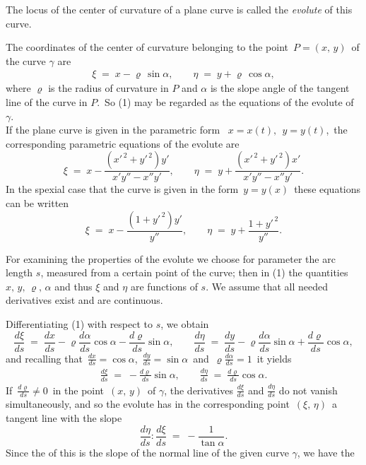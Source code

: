 \documentclass[12pt]{article}
\begin{document}
The locus of the center of curvature of a plane curve is called the {\em evolute} of this curve.

The coordinates of the center of curvature belonging to the point \,$P = (x,\,y)$\, of the curve $\gamma$ are
\begin{align}
\xi \;=\; x-\varrho\,\sin\alpha,\qquad \eta \;=\; y+\varrho\,\cos\alpha,
\end{align}
where $\varrho$ is the radius of curvature in $P$ and $\alpha$ is the slope angle of the tangent line of the curve in $P$.\, So (1) may be regarded as the equations of the evolute of $\gamma$.\\

If the plane curve is given in the parametric form \, $x = x(t),\;\, y = y(t)$,\, the corresponding parametric equations of the evolute are
 $$\xi \;=\; x-\frac{(x'^{\,2}\!+\!y'^{\,2})y'}{x'y''\!-\!x''y'},\qquad
 \eta \;=\; y+\frac{(x'^{\,2}\!+\!y'^{\,2})x'}{x'y''\!-\!x''y'}.$$
In the spexial case that the curve is given in the form\, $y = y(x)$\, these equations can be written
 $$\xi \;=\; x-\frac{(1\!+\!y'^{\,2})y'}{y''},\qquad \eta \;=\; y+\frac{1\!+\!y'^{\,2}}{y''}.$$


For examining the properties of the evolute we choose for parameter the arc length $s$, measured from a certain point of the curve; then in (1) the quantities $x,\,y,\,\varrho,\,\alpha$ and thus $\xi$ and $\eta$ are functions of $s$.  We assume that all needed derivatives exist and are continuous.

Differentiating (1) with respect to $s$, we obtain
 $$\frac{d\xi}{ds} \;=\; \frac{dx}{ds}-\varrho\frac{d\alpha}{ds}\cos\alpha-\frac{d\varrho}{ds}\sin\alpha,\qquad
  \frac{d\eta}{ds} \;=\; \frac{dy}{ds}-\varrho\frac{d\alpha}{ds}\sin\alpha+\frac{d\varrho}{ds}\cos\alpha,$$
and recalling that\, $\frac{dx}{ds} = \cos\alpha$,\, $\frac{dy}{ds} = \sin\alpha$\, and\, $\varrho\frac{d\alpha}{ds} = 1$\, it yields
\begin{align}
\frac{d\xi}{ds} \;=\; -\frac{d\varrho}{ds}\sin\alpha,\qquad \frac{d\eta}{ds} \;=\; \frac{d\varrho}{ds}\cos\alpha.
\end{align}
If\, $\frac{d\varrho}{ds} \neq 0$\, in the point \,$(x,\,y)$\, of $\gamma$, the derivatives $\frac{d\xi}{ds}$ and $\frac{d\eta}{ds}$ do not vanish simultaneously, and so the evolute has in the corresponding point\, $(\xi,\,\eta)$\, a tangent line with the slope
 $$\frac{d\eta}{ds}:\frac{d\xi}{ds} \;=\; -\frac{1}{\tan\alpha}.$$
Since the  of this is the slope of the normal line of the given curve $\gamma$, we have the
\end{document}
